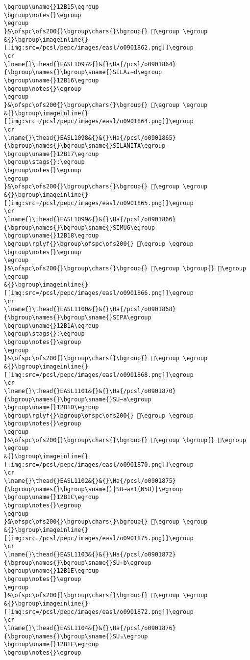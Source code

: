 \begin{verbatim}
\bgroup\uname{}12B15\egroup
\bgroup\notes{}\egroup
\egroup
}&\ofspc\ofs200{}\bgroup\chars{}\bgroup{} 𒬕\egroup \egroup
&{}\bgroup\imageinline{}[[img:src=/pcsl/pepc/images/easl/o0901862.png]]\egroup
\cr
\lname{}\thead{}EASL1097&{}&{}\Ha{/pcsl/o0901864}{\bgroup\names{}\bgroup\sname{}SILA₄∼d\egroup
\bgroup\uname{}12B16\egroup
\bgroup\notes{}\egroup
\egroup
}&\ofspc\ofs200{}\bgroup\chars{}\bgroup{} 𒬖\egroup \egroup
&{}\bgroup\imageinline{}[[img:src=/pcsl/pepc/images/easl/o0901864.png]]\egroup
\cr
\lname{}\thead{}EASL1098&{}&{}\Ha{/pcsl/o0901865}{\bgroup\names{}\bgroup\sname{}SILANITA\egroup
\bgroup\uname{}12B17\egroup
\bgroup\stags{}:\egroup
\bgroup\notes{}\egroup
\egroup
}&\ofspc\ofs200{}\bgroup\chars{}\bgroup{} 𒬗\egroup \egroup
&{}\bgroup\imageinline{}[[img:src=/pcsl/pepc/images/easl/o0901865.png]]\egroup
\cr
\lname{}\thead{}EASL1099&{}&{}\Ha{/pcsl/o0901866}{\bgroup\names{}\bgroup\sname{}SIMUG\egroup
\bgroup\uname{}12B18\egroup
\bgroup\rglyf{}\bgroup\ofspc\ofs200{} 𒬘\egroup \egroup
\bgroup\notes{}\egroup
\egroup
}&\ofspc\ofs200{}\bgroup\chars{}\bgroup{} 𒬘\egroup \bgroup{} 𒬙\egroup \egroup
&{}\bgroup\imageinline{}[[img:src=/pcsl/pepc/images/easl/o0901866.png]]\egroup
\cr
\lname{}\thead{}EASL1100&{}&{}\Ha{/pcsl/o0901868}{\bgroup\names{}\bgroup\sname{}SIPA\egroup
\bgroup\uname{}12B1A\egroup
\bgroup\stags{}:\egroup
\bgroup\notes{}\egroup
\egroup
}&\ofspc\ofs200{}\bgroup\chars{}\bgroup{} 𒬚\egroup \egroup
&{}\bgroup\imageinline{}[[img:src=/pcsl/pepc/images/easl/o0901868.png]]\egroup
\cr
\lname{}\thead{}EASL1101&{}&{}\Ha{/pcsl/o0901870}{\bgroup\names{}\bgroup\sname{}SU∼a\egroup
\bgroup\uname{}12B1D\egroup
\bgroup\rglyf{}\bgroup\ofspc\ofs200{} 𒬝\egroup \egroup
\bgroup\notes{}\egroup
\egroup
}&\ofspc\ofs200{}\bgroup\chars{}\bgroup{} 𒬛\egroup \bgroup{} 𒬝\egroup \egroup
&{}\bgroup\imageinline{}[[img:src=/pcsl/pepc/images/easl/o0901870.png]]\egroup
\cr
\lname{}\thead{}EASL1102&{}&{}\Ha{/pcsl/o0901875}{\bgroup\names{}\bgroup\sname{}|SU∼a×1(N58)|\egroup
\bgroup\uname{}12B1C\egroup
\bgroup\notes{}\egroup
\egroup
}&\ofspc\ofs200{}\bgroup\chars{}\bgroup{} 𒬜\egroup \egroup
&{}\bgroup\imageinline{}[[img:src=/pcsl/pepc/images/easl/o0901875.png]]\egroup
\cr
\lname{}\thead{}EASL1103&{}&{}\Ha{/pcsl/o0901872}{\bgroup\names{}\bgroup\sname{}SU∼b\egroup
\bgroup\uname{}12B1E\egroup
\bgroup\notes{}\egroup
\egroup
}&\ofspc\ofs200{}\bgroup\chars{}\bgroup{} 𒬞\egroup \egroup
&{}\bgroup\imageinline{}[[img:src=/pcsl/pepc/images/easl/o0901872.png]]\egroup
\cr
\lname{}\thead{}EASL1104&{}&{}\Ha{/pcsl/o0901876}{\bgroup\names{}\bgroup\sname{}SU₃\egroup
\bgroup\uname{}12B1F\egroup
\bgroup\notes{}\egroup

\end{verbatim}
